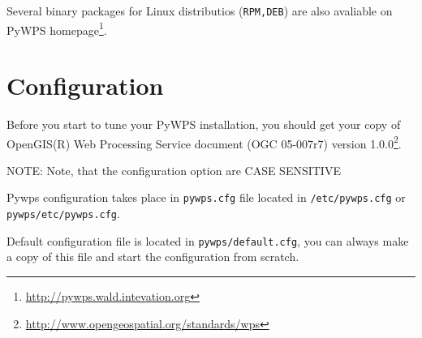 \documentclass[a4paper,11pt]{article}
\newcommand{\pywpssite}{\url{http://pywps.wald.intevation.org}}
\newcommand{\note}[1]{\medskip{}\noindent{}NOTE: #1\medskip{}}
\begin{document}
Several binary packages for Linux distributios (\texttt{RPM,DEB}) are also avaliable on PyWPS
homepage\footnote{\pywpssite}.

\section{Configuration}
\label{configuration}
    
Before you start to tune your PyWPS installation, you should get your copy of
OpenGIS(R) Web Processing Service document (OGC  05-007r7) version
1.0.0\footnote{\url{http://www.opengeospatial.org/standards/wps}}.
    
\note{Note, that the configuration option are CASE SENSITIVE}
    
Pywps configuration takes place in \texttt{pywps.cfg} file located in
\texttt{/etc/pywps.cfg} or \texttt{pywps/etc/pywps.cfg}. 

Default configuration file is located in \texttt{pywps/default.cfg}, you
can always make a copy of this file and start the configuration from
scratch.
    
\end{document}
